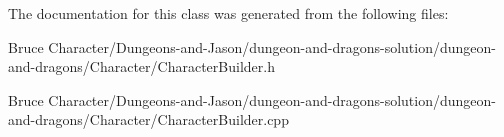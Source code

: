 The documentation for this class was generated from the following files\+:\begin{DoxyCompactItemize}
\item 
Bruce Character/\+Dungeons-\/and-\/\+Jason/dungeon-\/and-\/dragons-\/solution/dungeon-\/and-\/dragons/\+Character/Character\+Builder.\+h\item 
Bruce Character/\+Dungeons-\/and-\/\+Jason/dungeon-\/and-\/dragons-\/solution/dungeon-\/and-\/dragons/\+Character/Character\+Builder.\+cpp\end{DoxyCompactItemize}
